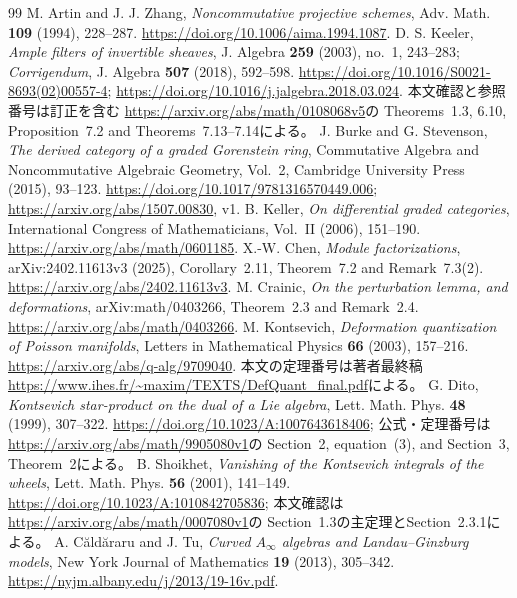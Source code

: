 \begin{thebibliography}{99}
 M. Artin and J. J. Zhang,
\emph{Noncommutative projective schemes}, Adv. Math. \textbf{109} (1994), 228--287.
\url{https://doi.org/10.1006/aima.1994.1087}.
 D. S. Keeler,
\emph{Ample filters of invertible sheaves},
J. Algebra \textbf{259} (2003), no.~1, 243--283;
\emph{Corrigendum}, J. Algebra \textbf{507} (2018), 592--598.
\url{https://doi.org/10.1016/S0021-8693(02)00557-4};
\url{https://doi.org/10.1016/j.jalgebra.2018.03.024}.
本文確認と参照番号は訂正を含む
\url{https://arxiv.org/abs/math/0108068v5}の
Theorems~1.3, 6.10, Proposition~7.2 and Theorems~7.13--7.14による。
 J. Burke and G. Stevenson,
\emph{The derived category of a graded Gorenstein ring},
Commutative Algebra and Noncommutative Algebraic Geometry, Vol.~2,
Cambridge University Press (2015), 93--123.
\url{https://doi.org/10.1017/9781316570449.006};
\url{https://arxiv.org/abs/1507.00830}, v1.
 B. Keller,
\emph{On differential graded categories},
International Congress of Mathematicians, Vol.~II (2006), 151--190.
\url{https://arxiv.org/abs/math/0601185}.
 X.-W. Chen,
\emph{Module factorizations}, arXiv:2402.11613v3 (2025),
Corollary~2.11, Theorem~7.2 and Remark~7.3(2).
\url{https://arxiv.org/abs/2402.11613v3}.
 M. Crainic,
\emph{On the perturbation lemma, and deformations}, arXiv:math/0403266,
Theorem~2.3 and Remark~2.4.
\url{https://arxiv.org/abs/math/0403266}.
 M. Kontsevich,
\emph{Deformation quantization of Poisson manifolds},
Letters in Mathematical Physics \textbf{66} (2003), 157--216.
\url{https://arxiv.org/abs/q-alg/9709040}.
本文の定理番号は著者最終稿
\url{https://www.ihes.fr/~maxim/TEXTS/DefQuant_final.pdf}による。
 G. Dito,
\emph{Kontsevich star-product on the dual of a Lie algebra},
Lett. Math. Phys. \textbf{48} (1999), 307--322.
\url{https://doi.org/10.1023/A:1007643618406};
公式・定理番号は\url{https://arxiv.org/abs/math/9905080v1}の
Section~2, equation~(3), and Section~3, Theorem~2による。
 B. Shoikhet,
\emph{Vanishing of the Kontsevich integrals of the wheels},
Lett. Math. Phys. \textbf{56} (2001), 141--149.
\url{https://doi.org/10.1023/A:1010842705836};
本文確認は\url{https://arxiv.org/abs/math/0007080v1}の
Section~1.3の主定理とSection~2.3.1による。
 A. C\u{a}ld\u{a}raru and J. Tu,
\emph{Curved $A_\infty$ algebras and Landau--Ginzburg models},
New York Journal of Mathematics \textbf{19} (2013), 305--342.
\url{https://nyjm.albany.edu/j/2013/19-16v.pdf}.

\end{thebibliography}
